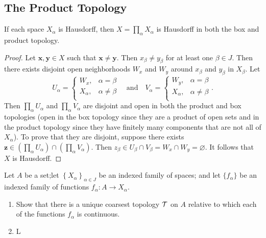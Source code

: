 \subsection{The Product Topology}
\begin{ex}{19.3}
    If each space $X_\alpha$ is Hausdorff, then $X =\prod_\alpha X_\alpha$ is Hausdorff in both the box and product topology.
\end{ex}
\begin{proof}
    Let $\mathbf{x}, \mathbf{y}\in X$ such that $\mathbf{x}\neq\mathbf{y}$. Then $x_\beta\neq y_\beta$ for at least one $\beta\in J$.
    Then there exists disjoint open neighborhoods $W_x$ and $W_y$ around $x_\beta$ and $y_\beta$ in  $X_\beta$. Let
    $$
    U_\alpha=
    \begin{cases}
        W_x,&\alpha=\beta\\
        X_\alpha,&\alpha\neq\beta\\
    \end{cases}
    \quad\text{and}\quad 
    V_\alpha= 
    \begin{cases}
        W_y,&\alpha=\beta\\
        X_\alpha,&\alpha\neq\beta\\
    \end{cases}.
    $$
    Then $\prod_\alpha U_\alpha$ and $\prod_\alpha V_\alpha$ are disjoint and open in both the product and box topologies
    (open in the box topology since they are a product of open sets and in the product topology since they have finitely many components that are not all of $X_\alpha$).
    To prove that they are disjoint, suppose there exists $\mathbf{z}\in\left(\prod_\alpha U_\alpha\right)\cap\left(\prod_\alpha V_\alpha\right)$.
    Then $z_\beta\in U_\beta\cap V_\beta=W_x\cap W_y=\varnothing$.
    It follows that $X$ is Hausdorff.
\end{proof}

\begin{ex}{19.10}
    Let $A$ be a set;let $\left\{X_\alpha\right\}_{\alpha\in J}$ be an indexed family of spaces; and let $\{f_\alpha\}$ be an indexed family of functions $f_\alpha:A\to X_\alpha$.
    \begin{enumerate}
        \item Show that there is a unique coarsest topology $\mathcal{T}$ on $A$ relative to which each of the functions $f_\alpha$ is continuous.
        \item L
    \end{enumerate}
\end{ex}